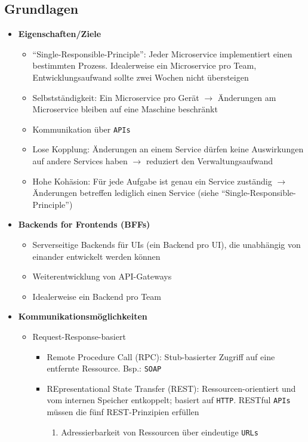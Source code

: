 \subsection{Grundlagen}
\begin{itemize}
	\item \textbf{Eigenschaften/Ziele}
	\begin{itemize}
		\item "`Single-Responsible-Principle"': Jeder Microservice implementiert einen bestimmten Prozess. Idealerweise ein Microservice pro Team, Entwicklungsaufwand sollte zwei Wochen nicht übersteigen
		\item Selbstständigkeit: Ein Microservice pro Gerät \(\rightarrow\) Änderungen am Microservice bleiben auf eine Maschine beschränkt
		\item Kommunikation über \texttt{APIs}
		\item Lose Kopplung: Änderungen an einem Service dürfen keine Auswirkungen auf andere Services haben \(\rightarrow\) reduziert den Verwaltungsaufwand
		\item Hohe Kohäsion: Für jede Aufgabe ist genau ein Service zuständig \(\rightarrow\) Änderungen betreffen lediglich einen Service (siehe "`Single-Responsible-Principle"')
	\end{itemize}
	\item \textbf{Backends for Frontends (BFFs)}
	\begin{itemize}
		\item Serverseitige Backends für UIs (ein Backend pro UI), die unabhängig von einander entwickelt werden können
		\item Weiterentwicklung von API-Gateways
		\item Idealerweise ein Backend pro Team
	\end{itemize}
	\item \textbf{Kommunikationsmöglichkeiten}
	\begin{itemize}
		\item Request-Response-basiert
		\begin{itemize}
			\item Remote Procedure Call (RPC): Stub-basierter Zugriff auf eine entfernte Ressource. Bsp.: \texttt{SOAP}
			\item REpresentational State Transfer (REST): Ressourcen-orientiert und vom internen Speicher entkoppelt; basiert auf \texttt{HTTP}. RESTful \texttt{APIs} müssen die fünf REST-Prinzipien erfüllen
			\begin{enumerate}
				\item Adressierbarkeit von Ressourcen über eindeutige \texttt{URLs}

\end{enumerate}
\end{itemize}
\end{itemize}
\end{itemize}
